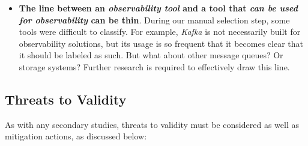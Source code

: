 \documentclass[sigconf]{acmart}
\begin{document}
\begin{itemize}
  of the OSS tools are so ubiquitous that vendors are effectively forced
  to implement support for them, further showing the strength OSS has in
  standardization and interoperability. Practitioners should consider
  prioritizing OSS when adopting observability tooling that needs to
  interoperate, for example, in multi-cloud scenarios.
\item
  \textbf{The line between an \emph{observability tool} and a tool that
  \emph{can be used for observability} can be thin}. During our manual
  selection step, some tools were difficult to classify. For example,
  \emph{Kafka} is not necessarily built for observability solutions, but
  its usage is so frequent that it becomes clear that it should be
  labeled as such. But what about other message queues? Or storage
  systems? Further research is required to effectively draw this line.
\end{itemize}

\subsection{Threats to Validity}\label{threats-to-validity}

As with any secondary studies, threats to validity must be considered as
well as mitigation actions, as discussed below:
\end{document}
